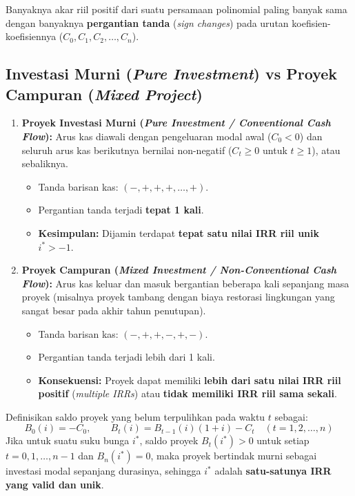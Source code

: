 \documentclass[11pt,a4paper]{article}
\begin{document}
\begin{definitionbox}
Banyaknya akar riil positif dari suatu persamaan polinomial paling banyak sama dengan banyaknya \textbf{pergantian tanda} (\textit{sign changes}) pada urutan koefisien-koefisiennya ($C_0, C_1, C_2, \dots, C_n$).
\end{definitionbox}

\subsection{Investasi Murni (\textit{Pure Investment}) vs Proyek Campuran (\textit{Mixed Project})}

\begin{enumerate}[label=\arabic*.]
    \item \textbf{Proyek Investasi Murni (\textit{Pure Investment / Conventional Cash Flow}):}
    Arus kas diawali dengan pengeluaran modal awal ($C_0 < 0$) dan seluruh arus kas berikutnya bernilai non-negatif ($C_t \ge 0$ untuk $t \ge 1$), atau sebaliknya.
    \begin{itemize}
        \item Tanda barisan kas: $(-, +, +, +, \dots, +)$.
        \item Pergantian tanda terjadi \textbf{tepat 1 kali}.
        \item \textbf{Kesimpulan:} Dijamin terdapat \textbf{tepat satu nilai IRR riil unik} $i^* > -1$.
    \end{itemize}

    \item \textbf{Proyek Campuran (\textit{Mixed Investment / Non-Conventional Cash Flow}):}
    Arus kas keluar dan masuk bergantian beberapa kali sepanjang masa proyek (misalnya proyek tambang dengan biaya restorasi lingkungan yang sangat besar pada akhir tahun penutupan).
    \begin{itemize}
        \item Tanda barisan kas: $(-, +, +, -, +, -)$.
        \item Pergantian tanda terjadi lebih dari 1 kali.
        \item \textbf{Konsekuensi:} Proyek dapat memiliki \textbf{lebih dari satu nilai IRR riil positif} (\textit{multiple IRRs}) atau \textbf{tidak memiliki IRR riil sama sekali}.
    \end{itemize}
\end{enumerate}

\begin{notebox}
Definisikan saldo proyek yang belum terpulihkan pada waktu $t$ sebagai:
\begin{equation}
    B_0(i) = -C_0, \qquad B_t(i) = B_{t-1}(i)(1 + i) - C_t \quad (t = 1, 2, \dots, n)
\end{equation}
Jika untuk suatu suku bunga $i^*$, saldo proyek $B_t(i^*) > 0$ untuk setiap $t = 0, 1, \dots, n-1$ dan $B_n(i^*) = 0$, maka proyek bertindak murni sebagai investasi modal sepanjang durasinya, sehingga $i^*$ adalah \textbf{satu-satunya IRR yang valid dan unik}.
\end{notebox}
\end{document}
